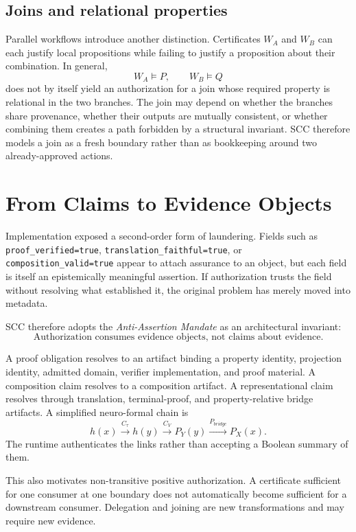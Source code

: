\documentclass[11pt]{article}
\begin{document}
\subsection{Joins and relational properties}
Parallel workflows introduce another distinction. Certificates $W_A$ and $W_B$ can each justify local propositions while failing to justify a proposition about their combination. In general,
\[
W_A\models P,\qquad W_B\models Q
\]
does not by itself yield an authorization for a join whose required property is relational in the two branches. The join may depend on whether the branches share provenance, whether their outputs are mutually consistent, or whether combining them creates a path forbidden by a structural invariant. SCC therefore models a join as a fresh boundary rather than as bookkeeping around two already-approved actions.

\section{From Claims to Evidence Objects}
Implementation exposed a second-order form of laundering. Fields such as \texttt{proof\_verified=true}, \texttt{translation\_faithful=true}, or \texttt{composition\_valid=true} appear to attach assurance to an object, but each field is itself an epistemically meaningful assertion. If authorization trusts the field without resolving what established it, the original problem has merely moved into metadata.

SCC therefore adopts the \emph{Anti-Assertion Mandate} as an architectural invariant:
\[
\boxed{\text{Authorization consumes evidence objects, not claims about evidence.}}
\]

A proof obligation resolves to an artifact binding a property identity, projection identity, admitted domain, verifier implementation, and proof material. A composition claim resolves to a composition artifact. A representational claim resolves through translation, terminal-proof, and property-relative bridge artifacts. A simplified neuro-formal chain is
\[
h(x)\xrightarrow{C_\tau}h(y)\xrightarrow{C_V}P_Y(y)\xrightarrow{P_{bridge}}P_X(x).
\]
The runtime authenticates the links rather than accepting a Boolean summary of them.

This also motivates non-transitive positive authorization. A certificate sufficient for one consumer at one boundary does not automatically become sufficient for a downstream consumer. Delegation and joining are new transformations and may require new evidence.
\end{document}
